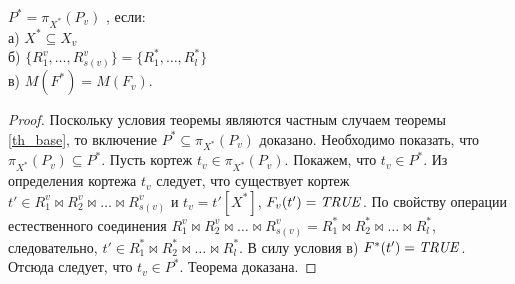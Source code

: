 \author{Мосин Сергей, Зыкин Сергей}
\begin{theorem}
$P^{\ast} = \pi_{X^{\ast}} (P_{v})$
, если: 
\\а) $X^{\ast} \subseteq X_{v}$
\\б) 
$\{R^{v}_{1}, \ldots, R^{v}_{s(v)}\} = \{R^{\ast}_{1}, \ldots, R^{\ast}_{l}\}$
\\в) $M (F^{\ast}) = M (F_{v}) $.
\label{th_base_eq}
\end{theorem} 
\begin{proof}
Поскольку условия теоремы являются частным случаем теоремы \ref{th_base}, то
включение $P^{\ast} \subseteq \pi_{X^{\ast}} (P_{v})$
доказано. Необходимо показать, что
$\pi_{X^{\ast}} (P_{v}) \subseteq P^{\ast}$. Пусть
кортеж $t_v \in \pi_{X^{\ast}} (P_{v})$. Покажем, что
$t_v \in P^{\ast}$. Из определения кортежа $t_v$ следует, что существует кортеж  $t' \in R^v_1 \Join R^v_2\Join\ldots \Join R^v_{s(v)}$ и $t_v = t'[X^{\ast}]$, $F_v(t')=\mathit{TRUE}$. По свойству операции естественного соединения $R^v_1 \Join R^v_2\Join\ldots \Join R^v_{s(v)} = R^{\ast}_1 \Join R^{\ast}_2\Join\ldots \Join R^{\ast}_l$, следовательно, $t' \in R^{\ast}_1 \Join R^{\ast}_2\Join\ldots \Join R^{\ast}_l$. В силу условия в) $F^{\ast} (t')=\mathit{TRUE}$. Отсюда следует, что $t_v \in P^{\ast}$. Теорема доказана.
\end{proof}
